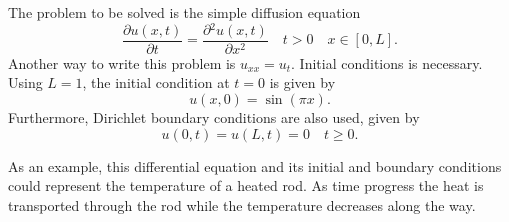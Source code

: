\documentclass[a4paper,11pt,twocolumn]{article}
\begin{document}
The problem to be solved is the simple diffusion equation
\begin{equation}
\frac{\partial u(x,t)}{\partial t}=\frac{\partial{^2}u(x,t)}{\partial x^2} \quad t>0 \quad x\in [0,L].
	\label{eq:diff}
\end{equation}
Another way to write this problem is $u_{xx} = u_t$. Initial conditions is necessary. Using $L=1$, the initial condition at $t=0$ is given by
\begin{equation}
    u(x,0) = \sin(\pi x)
    \label{eq:incond}.
\end{equation}
Furthermore, Dirichlet boundary conditions are also used, given by
\begin{equation*}
    u(0,t) = u(L,t) = 0 \quad t \geq 0.
\end{equation*}

As an example, this differential equation and its initial and boundary conditions could represent the temperature of a heated rod. As time progress the heat is transported through the rod while the temperature decreases along the way.
\end{document}
